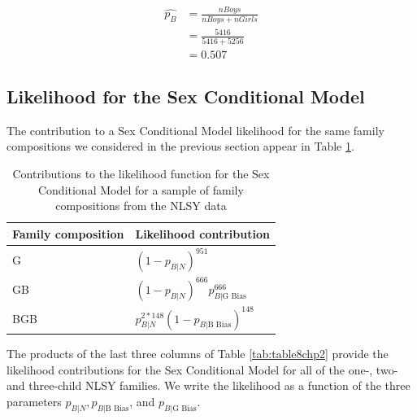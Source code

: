 \documentclass[
]{krantz}
\newcommand{\neutral}{p_{B|N}}
\newcommand{\gbias}{p_{B|\textrm{G Bias}}}
\newcommand{\bbias}{p_{B|\textrm{B Bias}}}
\begin{document}
\begin{equation*}
\begin{split}
 \hat{p_B} &= \frac{nBoys}{nBoys + nGirls} \\
 & =  \frac{5416}{5416+5256} \\
 &= 0.507
\end{split}
\end{equation*}

\hypertarget{sex-cond-lik}{%
\subsection{Likelihood for the Sex Conditional Model}\label{sex-cond-lik}}

The contribution to a Sex Conditional Model likelihood for the same family compositions we considered in the previous section appear in Table \ref{tab:sexcondmodel}.

\begin{table}

\caption{\label{tab:sexcondmodel}Contributions to the likelihood function for the Sex Conditional Model for a sample of family compositions from the NLSY data}
\centering
\begin{tabular}[t]{>{\raggedright\arraybackslash}p{5cm}>{\raggedright\arraybackslash}p{5cm}}
\toprule
Family composition & Likelihood contribution\\
\midrule
G & $(1-\neutral)^{951}$\\
GB & $(1-\neutral)^{666}\gbias^{666}$\\
BGB & $\neutral^{2*148}(1-\bbias)^{148}$\\
\bottomrule
\end{tabular}
\end{table}

The products of the last three columns of Table \ref{tab:table8chp2} provide the likelihood contributions for the Sex Conditional Model for all of the one-, two- and three-child NLSY families. We write the likelihood as a function of the three parameters \(\neutral, \bbias\), and \(\gbias\).
\end{document}

